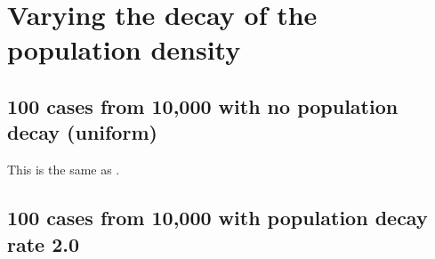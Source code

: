 \section{Varying the decay of the population density}

\subsection{100 cases from 10,000 with no population decay (uniform)}

This is the same as .

\begin{table}[H]
\centering
\scriptsize

    \begin{subtable}{0.5\textwidth}
    
    \caption{Means} 
    \end{subtable}%
    \begin{subtable}{0.5\textwidth}
    
    \caption{Standard deviations} 
    \end{subtable}

\caption{Error rates for uniform population of 10,000, single peak intensity of factor 100 and no population decay (uniform)}
\label{tbl:mean_error_rates:unif_100_unif:3}
\end{table}

\subsection{100 cases from 10,000 with population decay rate 2.0}
\begin{table}[H]
\centering
\scriptsize

    \begin{subtable}{0.5\textwidth}
    
    \caption{Means} 
    \end{subtable}%
    \begin{subtable}{0.5\textwidth}
    
    \caption{Standard deviations} 
    \end{subtable}

\caption{Error rates for uniform population of 10,000, single peak intensity of factor 100 and decay rate 2.0}
\label{tbl:mean_error_rates:p2.0_100_1_1h}
\end{table}

